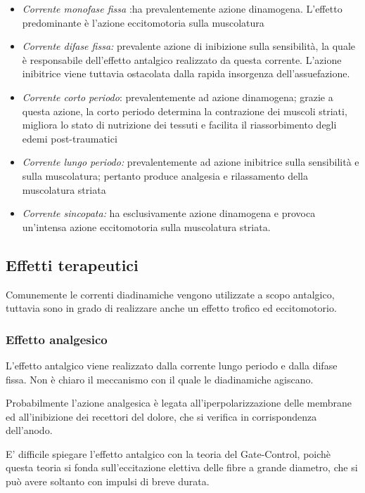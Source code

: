 \begin{itemize}
\item
  \emph{Corrente monofase fissa} :ha prevalentemente azione dinamogena. L'effetto predominante è l'azione eccitomotoria sulla muscolatura
\item
  \emph{Corrente difase fissa:} prevalente azione di inibizione sulla sensibilità, la quale è responsabile dell'effetto antalgico realizzato da questa corrente. L'azione inibitrice viene tuttavia ostacolata dalla rapida insorgenza dell'assuefazione.
\item
  \emph{Corrente corto periodo}: prevalentemente ad azione dinamogena; grazie a questa azione, la corto periodo determina la contrazione dei muscoli striati, migliora lo stato di nutrizione dei tessuti e facilita il riassorbimento degli edemi post-traumatici
\item
  \emph{Corrente lungo periodo:} prevalentemente ad azione inibitrice sulla sensibilità e sulla muscolatura; pertanto produce analgesia e rilassamento della muscolatura striata
\item
  \emph{Corrente sincopata:} ha esclusivamente azione dinamogena e provoca un'intensa azione eccitomotoria sulla muscolatura striata.
\end{itemize}

\subsection{Effetti terapeutici}

Comunemente le correnti diadinamiche vengono utilizzate a scopo antalgico, tuttavia sono in grado di realizzare anche un effetto trofico ed eccitomotorio.

\subsubsection{Effetto analgesico}

L'effetto antalgico viene realizzato dalla corrente lungo periodo e dalla difase fissa. Non è chiaro il meccanismo con il quale le diadinamiche agiscano.

Probabilmente l'azione analgesica è legata all'iperpolarizzazione delle membrane ed all'inibizione dei recettori del dolore, che si verifica in
corrispondenza dell'anodo.

E' difficile spiegare l'effetto antalgico con la teoria del Gate-Control, poichè questa teoria si fonda sull'eccitazione elettiva delle fibre a grande diametro, che si può avere soltanto con impulsi di breve durata.

